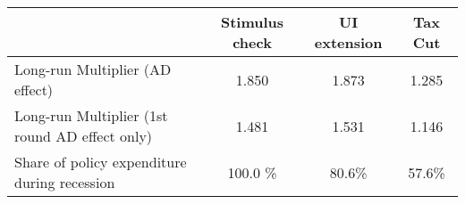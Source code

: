 \begin{tabular}{@{}lccc@{}} 
\toprule 
& Stimulus check    & UI extension    & Tax Cut    \\  \midrule 
Long-run Multiplier (AD effect) & 1.850  & 1.873  & 1.285     \\ 
Long-run Multiplier (1st round AD effect only) & 1.481  & 1.531  & 1.146     \\ 
Share of policy expenditure during recession & 100.0 \%  & 80.6\%  &  57.6\%  \\ 
\bottomrule 
\end{tabular}  


